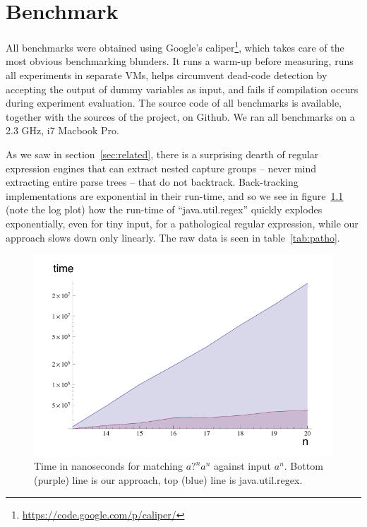 \documentclass[11pt,a4paper,twoside,openright]{Thesis}
\theoremstyle{definition}
\newcommand{\Figref}[1]{figure~\ref{fig:#1}}
\newcommand{\Secref}[1]{section~\ref{sec:#1}}
\newcommand{\Tabref}[1]{table~\ref{tab:#1}}
\newcommand{\figlabel}[1]{\label{fig:#1}}
\newcommand{\seclabel}[1]{\label{sec:#1}}
\begin{document}
\chapter{Benchmark}
\seclabel{benchmarks}
All benchmarks were obtained using Google's
caliper\footnote{\url{https://code.google.com/p/caliper/}}, which
takes care of the most obvious benchmarking blunders.  It runs a
warm-up before measuring, runs all experiments in separate VMs,
helps circumvent dead-code detection by accepting the output of
dummy variables as input, and fails if compilation occurs during
experiment evaluation.  The source code of all benchmarks is
available, together with the sources of the project, on Github. We
ran all benchmarks on a 2.3 GHz, i7 Macbook Pro.

As we saw in \Secref{related}, there is a surprising dearth
of regular expression engines that can extract nested capture groups
-- never mind extracting entire parse trees -- that do not backtrack.
Back-tracking implementations are exponential in their run-time,
and so we see in \Figref{patho} (note the log plot) how the run-time
of ``java.util.regex'' quickly explodes exponentially, even for tiny input, for
a pathological regular expression, while our approach slows down
only linearly. The raw data is seen in \Tabref{patho}.

\begin{figure}[htp]
\includegraphics[width=\linewidth]{graphs/pathological-with-axes.pdf}
\caption[Pathological regular expression parse time]{Time in nanoseconds for matching $\textit{a?}^n\textit{a}^n$ against
input $\textit{a}^n$. Bottom (purple) line is our approach, top (blue) line is
java.util.regex.}
\figlabel{patho}
\end{figure}
\end{document}
